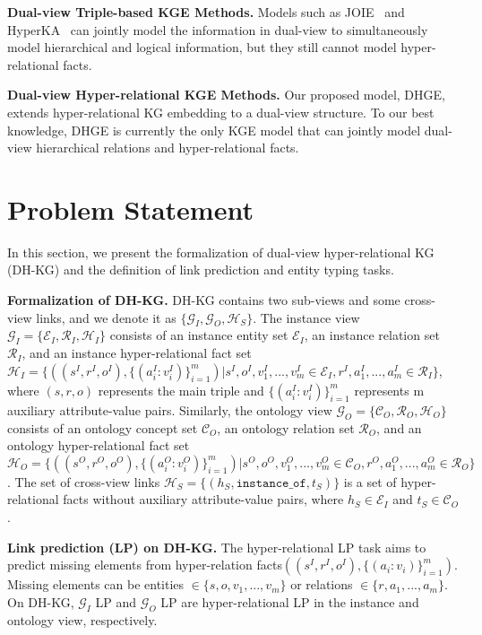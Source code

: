 \documentclass[letterpaper]{article} \usepackage{aaai23}  \usepackage{times}  \usepackage{helvet}  \usepackage{courier}  \usepackage[hyphens]{url}  \usepackage{graphicx} \urlstyle{rm} \def\UrlFont{\rm}  \usepackage{natbib}  \usepackage{caption} \frenchspacing  \setlength{\pdfpagewidth}{8.5in}  \setlength{\pdfpageheight}{11in}  \usepackage{times}
\begin{document}
{\bf Dual-view Triple-based KGE Methods. }
Models such as JOIE~\citep{JOIE} and HyperKA~\citep{HyperKA} can jointly model the information in dual-view to simultaneously model hierarchical and logical information, but they still cannot model hyper-relational facts.

{\bf Dual-view Hyper-relational KGE Methods. }
Our proposed model, DHGE, extends hyper-relational KG embedding to a dual-view structure. To our best knowledge, DHGE is currently the only KGE model that can jointly model dual-view hierarchical relations and hyper-relational facts.





\section{Problem Statement}
\label{s3}
In this section, we present the formalization of dual-view hyper-relational KG (DH-KG) and the definition of link prediction and entity typing tasks.

\textbf{Formalization of DH-KG.} DH-KG contains two sub-views and some cross-view links, and we denote it as $\{\mathcal{G}_I, \mathcal{G}_O, \mathcal{H}_S\}$. The instance view $\mathcal{G}_I=\{\mathcal{E}_I, \mathcal{R}_I, \mathcal{H}_I\}$ consists of an instance entity set $\mathcal{E}_I$, an instance relation set $\mathcal{R}_I$, and an instance hyper-relational fact set $\mathcal{H}_I=\{((s^I,r^I,o^I),\{(a^I_i:v^I_i)\}^m_{i=1})|s^I,o^I,v^I_1, ...,v^I_m\in\mathcal{E}_I, r^I,a^I_1,...,a^I_m\in\mathcal{R}_I\}$, where $(s,r,o)$ represents the main triple and $\{(a^I_i:v^I_i)\}^m_{i=1}$ represents m auxiliary attribute-value pairs. Similarly, the ontology view $\mathcal{G}_O=\{\mathcal{C}_O,\mathcal{R}_O,\mathcal{H}_O\}$ consists of an ontology concept set $\mathcal{C}_O$, an ontology relation set $\mathcal{R}_O$, and an ontology hyper-relational fact set $\mathcal{H}_O=\{((s^O,r^O,o^O),\{(a^O_i:v^O_i)\}^m_{i=1})|s^O,o^O,v^O_1,...,v^O_m\in\mathcal{C}_O, r^O,a^O_1,...,a^O_m\in\mathcal{R}_O\}$. The set of cross-view links $\mathcal{H}_S=\{(h_S,\texttt{instance\_of},t_S)\}$ is a set of hyper-relational facts without auxiliary attribute-value pairs, where $h_S \in\mathcal{E}_I$ and $t_S\in\mathcal{C}_O$.

\textbf{Link prediction (LP) on DH-KG.} The hyper-relational LP task aims to predict missing elements from hyper-relation facts$((s^I,r^I,o^I),\{(a_i:v_i)\}^m_{i=1})$. Missing elements can be entities $\in\{s,o,v_1,...,v_m\}$ or relations $\in\{r,a_1,...,a_m\}$. On DH-KG, $\mathcal{G}_I$ LP and $\mathcal{G}_O$ LP are hyper-relational LP in the instance and ontology view, respectively.
\end{document}
